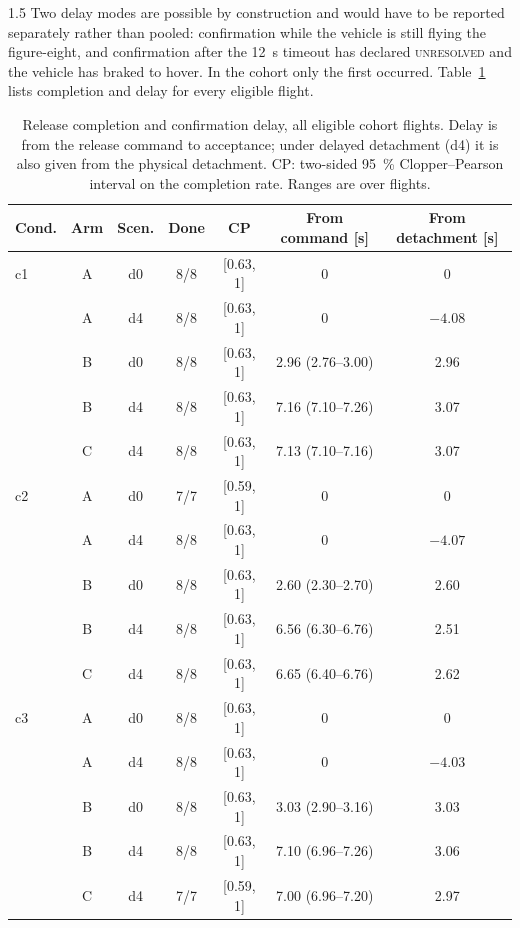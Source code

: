 \begin{spacing}{1.5}
Two delay modes are possible by construction and would have to be reported
separately rather than pooled: confirmation while the vehicle is still flying
the figure-eight, and confirmation after the \SI{12}{\second} timeout has
declared \textsc{unresolved} and the vehicle has braked to hover. In the cohort
only the first occurred. Table~\ref{tab:completion} lists completion and delay
for every eligible flight.

\begin{table}[ht]
\centering
\caption[Release completion and confirmation delay]{Release completion and confirmation delay, all eligible cohort flights.
Delay is from the release command to acceptance; under delayed detachment (d4)
it is also given from the physical detachment. CP: two-sided
\SI{95}{\percent} Clopper--Pearson interval on the completion rate. Ranges are
over flights.}
\label{tab:completion}
\small
\begin{tabular}{@{}l c c c c c c@{}}
\toprule
\textbf{Cond.} & \textbf{Arm} & \textbf{Scen.} & \textbf{Done} & \textbf{CP} &
\textbf{From command [s]} & \textbf{From detachment [s]} \\
\midrule
c1 & A & d0 & 8/8 & [0.63, 1] & 0 & 0 \\
   & A & d4 & 8/8 & [0.63, 1] & 0 & $-4.08$ \\
   & B & d0 & 8/8 & [0.63, 1] & 2.96 (2.76--3.00) & 2.96 \\
   & B & d4 & 8/8 & [0.63, 1] & 7.16 (7.10--7.26) & 3.07 \\
   & C & d4 & 8/8 & [0.63, 1] & 7.13 (7.10--7.16) & 3.07 \\
\midrule
c2 & A & d0 & 7/7 & [0.59, 1] & 0 & 0 \\
   & A & d4 & 8/8 & [0.63, 1] & 0 & $-4.07$ \\
   & B & d0 & 8/8 & [0.63, 1] & 2.60 (2.30--2.70) & 2.60 \\
   & B & d4 & 8/8 & [0.63, 1] & 6.56 (6.30--6.76) & 2.51 \\
   & C & d4 & 8/8 & [0.63, 1] & 6.65 (6.40--6.76) & 2.62 \\
\midrule
c3 & A & d0 & 8/8 & [0.63, 1] & 0 & 0 \\
   & A & d4 & 8/8 & [0.63, 1] & 0 & $-4.03$ \\
   & B & d0 & 8/8 & [0.63, 1] & 3.03 (2.90--3.16) & 3.03 \\
   & B & d4 & 8/8 & [0.63, 1] & 7.10 (6.96--7.26) & 3.06 \\
   & C & d4 & 7/7 & [0.59, 1] & 7.00 (6.96--7.20) & 2.97 \\
\bottomrule
\end{tabular}
\end{table}


\end{spacing}
